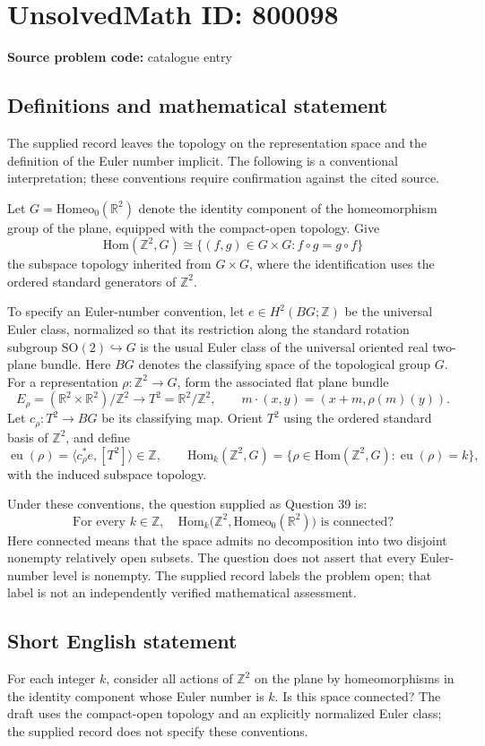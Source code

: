 \documentclass[11pt]{article}
\newcommand{\Z}{\mathbb{Z}}
\newcommand{\R}{\mathbb{R}}
\begin{document}
\section*{UnsolvedMath ID: 800098}
\textbf{Source problem code:} catalogue entry
\subsection{Definitions and mathematical statement}
The supplied record leaves the topology on the representation space and the definition of the Euler number implicit. The following is a conventional interpretation; these conventions require confirmation against the cited source.

Let \(G=\mathrm{Homeo}_0(\R^2)\) denote the identity component of the homeomorphism group of the plane, equipped with the compact-open topology. Give
\[
\mathrm{Hom}(\Z^2,G)
\cong \{(f,g)\in G\times G: f\circ g=g\circ f\}
\]
the subspace topology inherited from \(G\times G\), where the identification uses the ordered standard generators of \(\Z^2\).

To specify an Euler-number convention, let \(e\in H^2(BG;\Z)\) be the universal Euler class, normalized so that its restriction along the standard rotation subgroup \(\mathrm{SO}(2)\hookrightarrow G\) is the usual Euler class of the universal oriented real two-plane bundle. Here \(BG\) denotes the classifying space of the topological group \(G\). For a representation \(\rho:\Z^2\to G\), form the associated flat plane bundle
\[
E_\rho=(\R^2\times\R^2)/\Z^2\longrightarrow T^2=\R^2/\Z^2,
\qquad
m\cdot(x,y)=(x+m,\rho(m)(y)).
\]
Let \(c_\rho:T^2\to BG\) be its classifying map. Orient \(T^2\) using the ordered standard basis of \(\Z^2\), and define
\[
\operatorname{eu}(\rho)
=\bigl\langle c_\rho^*e,[T^2]\bigr\rangle\in\Z,
\qquad
\mathrm{Hom}_k(\Z^2,G)
=\{\rho\in\mathrm{Hom}(\Z^2,G):\operatorname{eu}(\rho)=k\},
\]
with the induced subspace topology.

Under these conventions, the question supplied as Question 39 is:
\[
\text{For every }k\in\Z,\quad
\mathrm{Hom}_k\bigl(\Z^2,\mathrm{Homeo}_0(\R^2)\bigr)
\text{ is connected?}
\]
Here connected means that the space admits no decomposition into two disjoint nonempty relatively open subsets. The question does not assert that every Euler-number level is nonempty. The supplied record labels the problem open; that label is not an independently verified mathematical assessment.
\subsection{Short English statement}
For each integer \(k\), consider all actions of \(\Z^2\) on the plane by homeomorphisms in the identity component whose Euler number is \(k\). Is this space connected? The draft uses the compact-open topology and an explicitly normalized Euler class; the supplied record does not specify these conventions.
\end{document}
